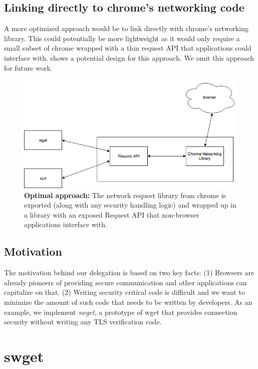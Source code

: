 \subsection{Linking directly to chrome's networking code}
A more optimized approach would be to link directly with chrome's networking
library. This could potentially be more lightweight as it would only require
a small subset of chrome wrapped with a thin request API that applications
could interface with.  shows a potential design for
this approach. We omit this approach for future work.

\begin{figure}[h]
  \includegraphics[width=\textwidth]{figures/long-term} \caption[Optimal
  approach]{\textbf{Optimal approach:} The network request library from chrome
  is exported (along with any security handling logic) and wrapped up in a
  library with an exposed Request API that non-browser applications interface
  with.} \label{fig:long-term-saber}
\end{figure}

\subsection{Motivation}
The motivation behind our delegation is based on two key facts: (1) Browsers
are already pioneers of providing secure communication and other applications
can capitalize on that. (2) Writing security critical code is difficult and we
want to minimize the amount of such code that needs to be written by
developers. As an example, we implement \emph{swget}, a prototype of wget that
provides connection security without writing any TLS verification code.

\section{swget}
\label{sec:swget-saber}


